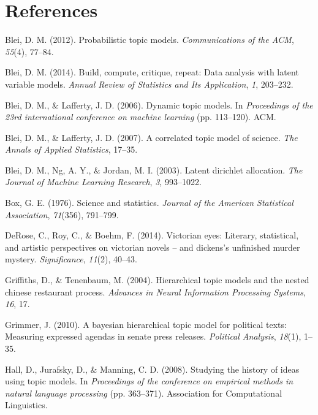 \documentclass[12pt,]{article}
\begin{document}
\section*{References}\label{references}

\hypertarget{refs}{}
\hypertarget{ref-blei2012probabilistic}{}
Blei, D. M. (2012). Probabilistic topic models. \emph{Communications of
the ACM}, \emph{55}(4), 77--84.

\hypertarget{ref-blei2014build}{}
Blei, D. M. (2014). Build, compute, critique, repeat: Data analysis with
latent variable models. \emph{Annual Review of Statistics and Its
Application}, \emph{1}, 203--232.

\hypertarget{ref-blei2006dynamic}{}
Blei, D. M., \& Lafferty, J. D. (2006). Dynamic topic models. In
\emph{Proceedings of the 23rd international conference on machine
learning} (pp. 113--120). ACM.

\hypertarget{ref-blei2007correlated}{}
Blei, D. M., \& Lafferty, J. D. (2007). A correlated topic model of
science. \emph{The Annals of Applied Statistics}, 17--35.

\hypertarget{ref-blei2003latent}{}
Blei, D. M., Ng, A. Y., \& Jordan, M. I. (2003). Latent dirichlet
allocation. \emph{The Journal of Machine Learning Research}, \emph{3},
993--1022.

\hypertarget{ref-box1976science}{}
Box, G. E. (1976). Science and statistics. \emph{Journal of the American
Statistical Association}, \emph{71}(356), 791--799.

\hypertarget{ref-derose2014victorian}{}
DeRose, C., Roy, C., \& Boehm, F. (2014). Victorian eyes: Literary,
statistical, and artistic perspectives on victorian novels -- and
dickens's unfinished murder mystery. \emph{Significance}, \emph{11}(2),
40--43.

\hypertarget{ref-griffiths2004hierarchical}{}
Griffiths, D., \& Tenenbaum, M. (2004). Hierarchical topic models and
the nested chinese restaurant process. \emph{Advances in Neural
Information Processing Systems}, \emph{16}, 17.

\hypertarget{ref-grimmer2010bayesian}{}
Grimmer, J. (2010). A bayesian hierarchical topic model for political
texts: Measuring expressed agendas in senate press releases.
\emph{Political Analysis}, \emph{18}(1), 1--35.

\hypertarget{ref-hall2008studying}{}
Hall, D., Jurafsky, D., \& Manning, C. D. (2008). Studying the history
of ideas using topic models. In \emph{Proceedings of the conference on
empirical methods in natural language processing} (pp. 363--371).
Association for Computational Linguistics.
\end{document}

